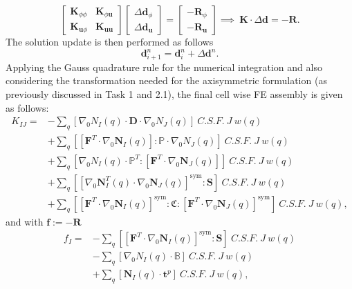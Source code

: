\documentclass[11pt,a4paper,final]{article}
\begin{document}
\begin{equation}
\begin{bmatrix}
\mathbf{K}_{\phi \phi} & \mathbf{K}_{\phi \mathbf{u}} \\
\mathbf{K}_{\mathbf{u} \phi} & \mathbf{K}_{\mathbf{u} \mathbf{u}}
\end{bmatrix}
\begin{bmatrix}
\Delta \mathbf{d}_{\phi} \\
\Delta \mathbf{d}_{\mathbf{u}}
\end{bmatrix}
=
\begin{bmatrix}
-\mathbf{R}_{\phi} \\
-\mathbf{R}_{\mathbf{u}}
\end{bmatrix}
\implies \ \mathbf{K} \cdot \Delta \mathbf{d} = -\mathbf{R}.
\label{eq:3.10}
\end{equation}
The solution update is then performed as follows
\begin{equation}
\mathbf{d}_{i+1}^n = \mathbf{d}_i^n + \Delta \mathbf{d}^n.
\label{eq:3.38}
\end{equation}
Applying the Gauss quadrature rule for the numerical integration and also considering the transformation needed for the axisymmetric formulation (as previously discussed in Task 1 and 2.1), the final cell wise FE assembly is given as follows:
\begin{align}
K_{IJ} = &- \sum\limits_q \left[ \nabla_0 N_I (q) \cdot \mathbf{D} \cdot \nabla_0 N_J (q) \right] \ C.S.F. \ J \ w(q) \nonumber \\
&+ \sum\limits_q \left[ \left[ \mathbf{F}^T \cdot \nabla_0 \mathbf{N}_I (q) \right] : \mathbb{P} \cdot \nabla_0 N_J (q) \right] \ C.S.F. \ J \ w(q) \nonumber \\
&+ \sum\limits_q \left[ \nabla_0 N_I (q) \cdot \mathbb{P}^T : \left[ \mathbf{F}^T \cdot \nabla_0 \mathbf{N}_J (q) \right] \right] \ C.S.F. \ J \ w(q) \nonumber \\
&+ \sum\limits_q \left[ \left[ \nabla_0 \mathbf{N}_I^T (q) \cdot \nabla_0 \mathbf{N}_J (q) \right]^{\text{sym}} : \mathbf{S} \right]  \ C.S.F. \ J \ w(q) \nonumber \\
&+ \sum\limits_q \left[ \left[ \mathbf{F}^T \cdot \nabla_0 \mathbf{N}_I (q) \right]^{\text{sym}} : \mathfrak{C} : \left[ \mathbf{F}^T \cdot \nabla_0 \mathbf{N}_J (q) \right]^{\text{sym}} \right] \ C.S.F. \ J \ w(q),
\label{eq:3.39}
\end{align}
and with $\mathbf{f} := -\mathbf{R}$
\begin{align}
f_I = &- \sum\limits_q \left[ \left[ \mathbf{F}^T \cdot \nabla_0 \mathbf{N}_I (q) \right]^{\text{sym}} : \mathbf{S} \right] \ C.S.F. \ J \ w(q) \nonumber \\
&- \sum\limits_q \left[ \nabla_0 N_I (q) \cdot \mathbb{B} \right] \ C.S.F. \ J \ w(q) \nonumber \\
&+ \sum\limits_q \left[ \mathbf{N}_I (q) \cdot \mathbf{t}^p \right] \ C.S.F. \ J \ w(q),
\label{eq:3.40}
\end{align}
\end{document}
